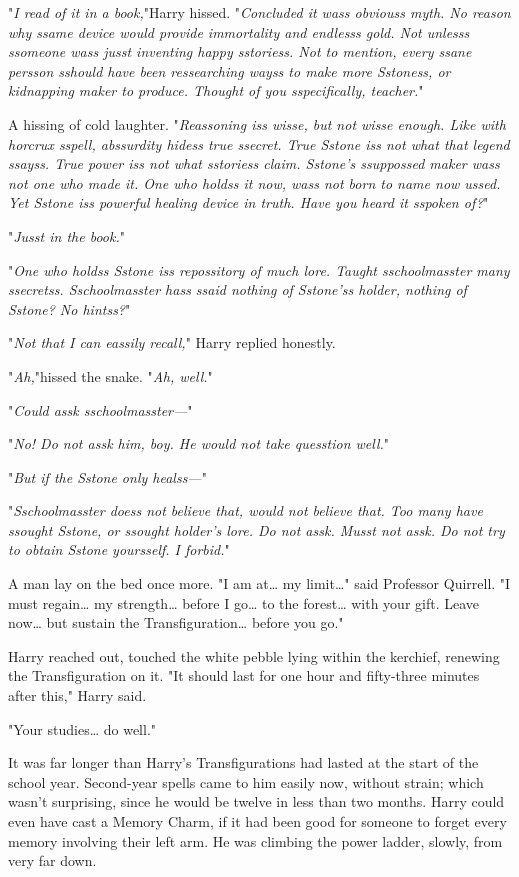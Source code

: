 "\emph{I read of it in a book,}"Harry hissed. "\emph{Concluded it wass obviouss 
myth. No reason why ssame device would provide immortality and endlesss gold. 
Not unlesss ssomeone wass jusst inventing happy sstoriess. Not to mention, 
every ssane persson sshould have been ressearching wayss to make more Sstoness, 
or kidnapping maker to produce. Thought of you sspecifically, teacher.}"

A hissing of cold laughter. "\emph{Reassoning iss wisse, but not wisse enough. 
Like with horcrux sspell, abssurdity hidess true ssecret. True Sstone iss not 
what that legend ssayss. True power iss not what sstoriess claim. Sstone's 
ssuppossed maker wass not one who made it. One who holdss it now, wass not born 
to name now ussed. Yet Sstone iss powerful healing device in truth. Have you 
heard it sspoken of?}"

"\emph{Jusst in the book.}"

"\emph{One who holdss Sstone iss repossitory of much lore. Taught 
sschoolmasster many ssecretss. Sschoolmasster hass ssaid nothing of Sstone'ss 
holder, nothing of Sstone? No hintss?}"

"\emph{Not that I can eassily recall,}" Harry replied honestly.

"\emph{Ah,}"hissed the snake. "\emph{Ah, well.}"

"\emph{Could assk sschoolmasster---}"

"\emph{No! Do not assk him, boy. He would not take quesstion well.}"

"\emph{But if the Sstone only healss---}"

"\emph{Sschoolmasster doess not believe that, would not believe that. Too many 
have ssought Sstone, or ssought holder's lore. Do not assk. Musst not assk. Do 
not try to obtain Sstone yoursself. I forbid.}"

A man lay on the bed once more. "I am at{\ldots} my limit{\ldots}" said 
Professor Quirrell. "I must regain{\ldots} my strength{\ldots} before I 
go{\ldots} to the forest{\ldots} with your gift. Leave now{\ldots} but sustain 
the Transfiguration{\ldots} before you go."

Harry reached out, touched the white pebble lying within the kerchief, renewing 
the Transfiguration on it. "It should last for one hour and fifty-three minutes 
after this," Harry said.

"Your studies{\ldots} do well."

It was far longer than Harry's Transfigurations had lasted at the start of the 
school year. Second-year spells came to him easily now, without strain; which 
wasn't surprising, since he would be twelve in less than two months. Harry 
could even have cast a Memory Charm, if it had been good for someone to forget 
every memory involving their left arm. He was climbing the power ladder, 
slowly, from very far down.

